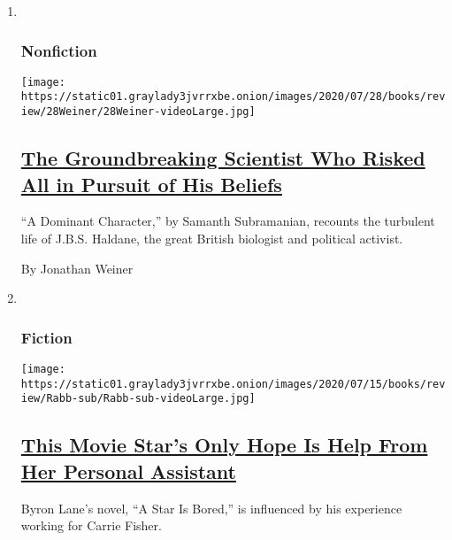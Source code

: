 \begin{enumerate}
\def\labelenumi{\arabic{enumi}.}
\item ~
  \hypertarget{nonfiction-3}{%
  \subsubsection{Nonfiction}\label{nonfiction-3}}

  \texttt{[image: https://static01.graylady3jvrrxbe.onion/images/2020/07/28/books/review/28Weiner/28Weiner-videoLarge.jpg]}

  \hypertarget{the-groundbreaking-scientist-who-risked-all-in-pursuit-of-his-beliefs}{%
  \subsection{\texorpdfstring{\href{/2020/07/28/books/review/a-dominant-character-haldane-samanth-subramanian.html}{The
  Groundbreaking Scientist Who Risked All in Pursuit of His
  Beliefs}}{The Groundbreaking Scientist Who Risked All in Pursuit of His Beliefs}}\label{the-groundbreaking-scientist-who-risked-all-in-pursuit-of-his-beliefs}}

  ``A Dominant Character,'' by Samanth Subramanian, recounts the
  turbulent life of J.B.S. Haldane, the great British biologist and
  political activist.

  By Jonathan Weiner
\item ~
  \hypertarget{fiction-1}{%
  \subsubsection{Fiction}\label{fiction-1}}

  \texttt{[image: https://static01.graylady3jvrrxbe.onion/images/2020/07/15/books/review/Rabb-sub/Rabb-sub-videoLarge.jpg]}

  \hypertarget{this-movie-stars-only-hope-is-help-from-her-personal-assistant}{%
  \subsection{\texorpdfstring{\href{/2020/07/28/books/review/a-star-is-bored-byron-lane.html}{This
  Movie Star's Only Hope Is Help From Her Personal
  Assistant}}{This Movie Star's Only Hope Is Help From Her Personal Assistant}}\label{this-movie-stars-only-hope-is-help-from-her-personal-assistant}}

  Byron Lane's novel, ``A Star Is Bored,'' is influenced by his
  experience working for Carrie Fisher.


\end{enumerate}
